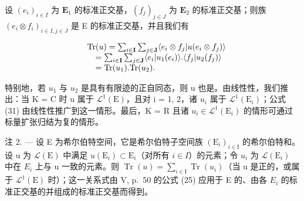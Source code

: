 设 \((e_i)_{i\in I}\) 为 \(\mathbf{E}_1\) 的标准正交基，\((f_j)_{j\in J}\) 为 \(\mathbf{E}_2\) 的标准正交基；则族 \((e_i\otimes f_i)_{i\in I,j\in J}\) 是 E 的标准正交基，并且我们有

\[
\begin{array}{r l} & {\mathrm{Tr} (u) = \sum_ {i \in \mathbf {I}} \sum_ {j \in \mathbf {J}} \langle e _ {i} \otimes f _ {j} | u (e _ {i} \otimes f _ {j}) \rangle} \\ & {\quad = \sum_ {i \in \mathbf {I}} \sum_ {j \in \mathbf {J}} \langle e _ {i} | u _ {1} (e _ {i}) \rangle . \langle f _ {j} | u _ {2} (f _ {j}) \rangle} \\ & {\quad = \mathrm{Tr} (u _ {1}). \mathrm{Tr} (u _ {2}).} \end{array}
\]

特别地，若 \(u_{1}\) 与 \(u_{2}\) 是具有有限迹的正自同态，则 u 也是。由线性性，我们推出：当 K = C 时 u 属于 \(\mathcal{L}^{1}(\mathrm{E})\)，且对 i = 1, 2，诸 \(u_{i}\) 属于 \(\mathcal{L}^{1}(\mathrm{E}_{i})\)；公式 (31) 由线性性推广到这一情形。最后，K = R 且诸 \(u_{i} \in \mathcal{L}^{1}(\mathrm{E}_{i})\) 的情形可通过标量扩张归结为复的情形。

注 2. --- 设 E 为希尔伯特空间，它是希尔伯特子空间族 \((\mathrm{E}_{i})_{i\in\mathrm{I}}\) 的希尔伯特和。设 u 为 \(\mathcal{L}(\mathrm{E})\) 中满足 \(u(\mathrm{E}_{i}) \subset \mathrm{E}_{i}\)（对所有 \(i \in I\)）的元素；令 \(u_{i}\) 为 \(\mathcal{L}(\mathrm{E}_{i})\) 中在 \(E_{i}\) 上与 u 一致的元素。则 \(\operatorname{Tr}(u) = \sum_{i \in \mathrm{I}} \operatorname{Tr}(u_{i})\)（当 u 是正的，或属于 \(\mathcal{L}^{1}(\mathrm{E})\) 时）；这一关系式由 V, p.~50 的公式 (25) 应用于 E 的、由各 \(E_{i}\) 的标准正交基的并组成的标准正交基而得到。

